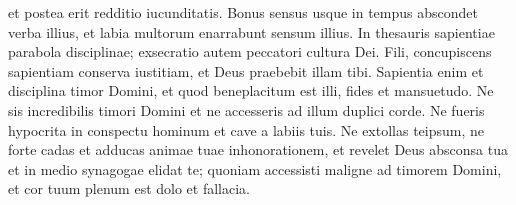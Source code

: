 \begin{biblechapter}
 et postea erit redditio iucunditatis.
 \verse Bonus sensus usque in tempus abscondet verba illius,
 et labia multorum enarrabunt sensum illius.
 \verse In thesauris sapientiae parabola disciplinae;
 \verse exsecratio autem peccatori cultura Dei.
 \verse Fili, concupiscens sapientiam conserva iustitiam,
 et Deus praebebit illam tibi.
 \verse Sapientia enim et disciplina timor Domini,
 et quod beneplacitum est illi,
 \verse fides et mansuetudo.
 \verse Ne sis incredibilis timori Domini
 et ne accesseris ad illum duplici corde.
 \verse Ne fueris hypocrita in conspectu hominum
 et cave a labiis tuis.
 \verse Ne extollas teipsum, ne forte cadas
 et adducas animae tuae inhonorationem,
 \verse et revelet Deus absconsa tua
 et in medio synagogae elidat te;
 \verse quoniam accessisti maligne ad timorem Domini,
 et cor tuum plenum est dolo et fallacia.
 

\end{biblechapter}
